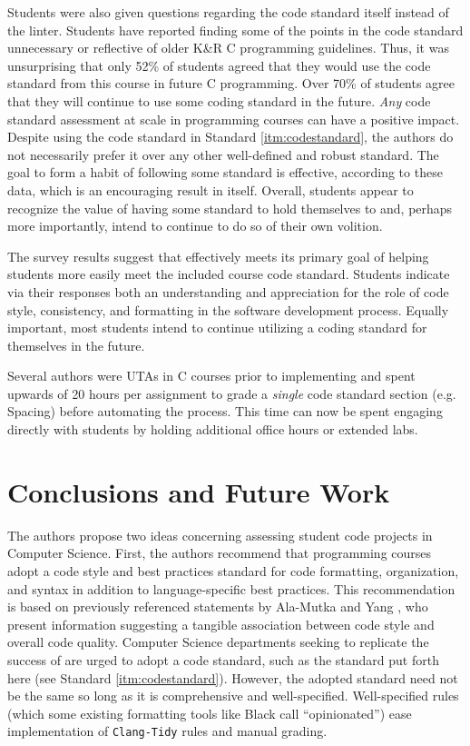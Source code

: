 \documentclass[sigconf]{acmart}
\begin{document}
Students were also given questions regarding the code standard itself instead of
the \tool{} linter. Students have reported finding some of the points in the code
standard unnecessary or reflective of older K\&R C programming
guidelines. Thus, it was unsurprising that only 52\% of students agreed that they would
use the code standard from this course in future C programming. Over 70\%
of students agree that they will continue to use some coding standard in the future. \textit{Any} code standard assessment at
scale in programming courses can have a positive impact. Despite using the code standard in Standard \ref{itm:codestandard}, the authors do not necessarily prefer it over any other well-defined and robust
standard. The goal to form a habit of following
some standard is effective, according to these data, which is an encouraging result in itself.
Overall, students appear to recognize the value of having some standard to
hold themselves to and, perhaps more importantly, intend to continue to do so of their own volition.

The survey results suggest that \tool{} effectively meets its primary goal of helping students more
easily meet the included course code standard. Students indicate
via their responses both an understanding and appreciation for the
role of code style, consistency, and formatting in the software development process. Equally important, most students
intend to continue utilizing a coding standard for themselves in the future.

Several authors were UTAs in C courses prior to implementing \tool{} and spent upwards of 20 hours per assignment to grade a
\textit{single} code standard section (e.g. Spacing) before automating the process. This time can now be spent engaging 
directly with students by holding additional office hours or extended labs.

\section{Conclusions and Future Work} \label{conclusions}

The authors propose two ideas concerning assessing student
code projects in Computer Science. First, the authors recommend
that programming courses adopt a code style and best practices
standard for code formatting, organization, and syntax in addition
to language-specific best practices. This recommendation is based
on previously referenced statements by Ala-Mutka \cite{doi:10.1080/08993400500150747} and Yang \cite{10.1145/3297156.3297227}, who present information suggesting a tangible association
between code style and overall code quality. Computer Science departments seeking to replicate the success of \tool{} are urged to adopt a code standard, such as the standard put forth here (see Standard \ref{itm:codestandard}). However, the adopted standard need not be the same
so long as it is comprehensive and well-specified. Well-specified
rules (which some existing formatting tools like Black call “opinionated”)
ease implementation of \texttt{Clang-Tidy}
rules and manual grading.
\end{document}
